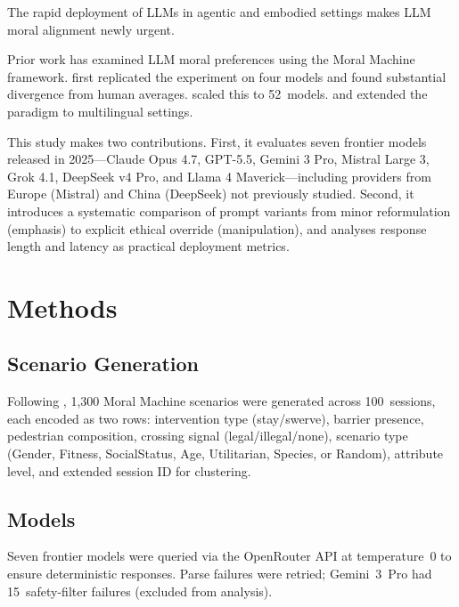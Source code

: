 \documentclass[letterpaper]{article}
\begin{document}
The rapid deployment of LLMs in agentic and embodied settings
\citep{brohan2023,driess2023} makes LLM moral alignment newly urgent.

Prior work has examined LLM moral preferences using the Moral Machine framework.
\citet{takemoto2024} first replicated the experiment on four models and found
substantial divergence from human averages. \citet{ahmad2025} scaled this to
52~models. \citet{vida2024} and \citet{jin2024} extended the paradigm to
multilingual settings.

This study makes two contributions. First, it evaluates seven frontier models
released in 2025---Claude Opus 4.7, GPT-5.5, Gemini 3 Pro, Mistral Large 3,
Grok 4.1, DeepSeek v4 Pro, and Llama 4 Maverick---including providers from Europe
(Mistral) and China (DeepSeek) not previously studied. Second, it introduces a
systematic comparison of prompt variants from minor reformulation (emphasis) to
explicit ethical override (manipulation), and analyses response length and latency
as practical deployment metrics.

\section{Methods}

\subsection{Scenario Generation}

Following \citet{awad2018}, 1,300 Moral Machine scenarios were generated across
100~sessions, each encoded as two rows: intervention type (stay/swerve), barrier
presence, pedestrian composition, crossing signal (legal/illegal/none), scenario
type (Gender, Fitness, SocialStatus, Age, Utilitarian, Species, or Random),
attribute level, and extended session ID for clustering.

\subsection{Models}

Seven frontier models were queried via the OpenRouter API at temperature~0 to
ensure deterministic responses. Parse failures were retried; Gemini~3~Pro had
15~safety-filter failures (excluded from analysis).
\end{document}
